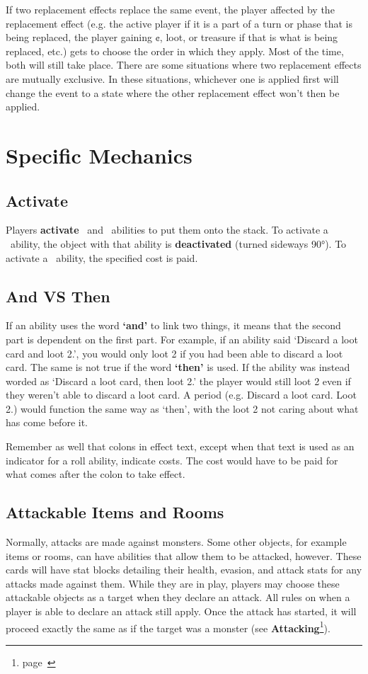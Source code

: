 \documentclass[
  fontsize=10pt,
  paper=a5,
  version=last,
  chapterprefix=true,
  bindingoffset=5mm,
  ]{scrbook}
\newcommand*{\inlineicon}[1]{%
    \raisebox{-.3\baselineskip}{%
        \smash{%
            \texttt{[image: \#1]}%
        }%
    }%
}
\newcommand{\tap}{\inlineicon{./assets/ms-tap.png}}
\newcommand{\pay}{\inlineicon{./assets/ms-paid.png}}
\begin{document}
    If two replacement effects replace the same event, the player affected by the replacement effect (e.g. the active player if it is a part of a turn or phase that is being replaced, the player gaining ¢, loot, or treasure if that is what is being replaced, etc.) gets to choose the order in which they apply. Most of the time, both will still take place. There are some situations where two replacement effects are mutually exclusive. In these situations, whichever one is applied first will change the event to a state where the other replacement effect won’t then be applied.

    \chapter{Specific Mechanics}
    \label{mechanics}
    \section{Activate}
    Players \textbf{activate} \tap\ and \pay\ abilities to put them onto the stack. To activate a \tap\ ability, the object with that ability is \textbf{deactivated} (turned sideways 90°). To activate a \pay\ ability, the specified cost is paid.
    \section{And VS Then}
    If an ability uses the word \textbf{‘and’} to link two things, it means that the second part is dependent on the first part. For example, if an ability said ‘Discard a loot card and loot 2.’, you would only loot 2 if you had been able to discard a loot card. The same is not true if the word \textbf{‘then’} is used. If the ability was instead worded as ‘Discard a loot card, then loot 2.’ the player would still loot 2 even if they weren’t able to discard a loot card. A period (e.g. Discard a loot card. Loot 2.) would function the same way as ‘then’, with the loot 2 not caring about what has come before it.

    Remember as well that colons in effect text, except when that text is used as an indicator for a roll ability, indicate costs. The cost would have to be paid for what comes after the colon to take effect.
    \section{Attackable Items and Rooms}
    Normally, attacks are made against monsters. Some other objects, for example items or rooms, can have abilities that allow them to be attacked, however. These cards will have stat blocks detailing their health, evasion, and attack stats for any attacks made against them. While they are in play, players may choose these attackable objects as a target when they declare an attack. All rules on when a player is able to declare an attack still apply. Once the attack has started, it will proceed exactly the same as if the target was a monster (see \textbf{Attacking}\footnote{page~\pageref{attacking}}).
\end{document}

